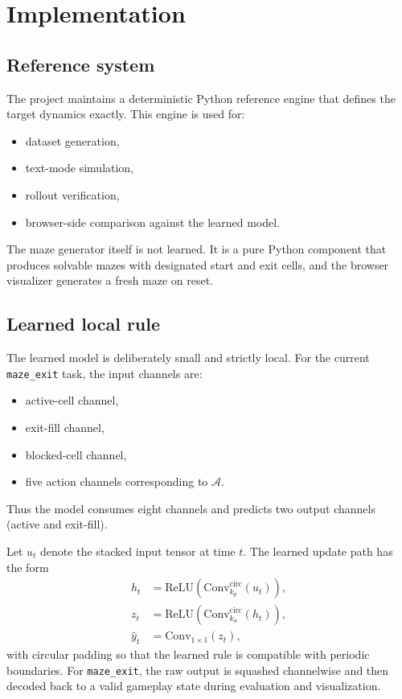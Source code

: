 \documentclass[11pt]{article}
\begin{document}
\section{Implementation}
\subsection{Reference system}
The project maintains a deterministic Python reference engine that defines the target dynamics exactly. This engine is used for:
\begin{itemize}
  \item dataset generation,
  \item text-mode simulation,
  \item rollout verification,
  \item browser-side comparison against the learned model.
\end{itemize}
The maze generator itself is not learned. It is a pure Python component that produces solvable mazes with designated start and exit cells, and the browser visualizer generates a fresh maze on reset.

\subsection{Learned local rule}
The learned model is deliberately small and strictly local. For the current \texttt{maze\_exit} task, the input channels are:
\begin{itemize}
  \item active-cell channel,
  \item exit-fill channel,
  \item blocked-cell channel,
  \item five action channels corresponding to \(\mathcal{A}\).
\end{itemize}
Thus the model consumes eight channels and predicts two output channels (active and exit-fill).

Let \(u_t\) denote the stacked input tensor at time \(t\). The learned update path has the form
\begin{align*}
h_t &= \mathrm{ReLU}\!\left(\mathrm{Conv}^{\mathrm{circ}}_{k_p}(u_t)\right), \\
z_t &= \mathrm{ReLU}\!\left(\mathrm{Conv}^{\mathrm{circ}}_{k_u}(h_t)\right), \\
\hat{y}_t &= \mathrm{Conv}_{1\times 1}(z_t),
\end{align*}
with circular padding so that the learned rule is compatible with periodic boundaries. For \texttt{maze\_exit}, the raw output is squashed channelwise and then decoded back to a valid gameplay state during evaluation and visualization.
\end{document}
